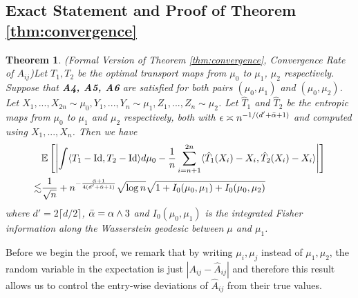 \documentclass[nohyperref]{article}
\DeclareMathOperator*{\id}{Id}
\newtheorem{theorem}{Theorem}
\theoremstyle{definition}
\begin{document}
\subsection{Exact Statement and Proof of Theorem \ref{thm:convergence}}\label{SM:Thm2Proof}


\begin{theorem}(Formal Version of Theorem \ref{thm:convergence}, Convergence Rate of $A_{ij}$)\label{thm:Thm3Proof_Exact}
    Let $T_1,T_2$ be the optimal transport maps from $\mu_0$ to $\mu_1$, $\mu_2$ respectively. Suppose that \textbf{A4, A5, A6} are satisfied for both pairs $(\mu_0, \mu_1)$ and $(\mu_0, \mu_2)$. Let $X_1,...,X_{2n} \sim \mu_0, Y_1,...,Y_n \sim \mu_1, Z_1,...,Z_n \sim \mu_2$. Let $\hat{T}_1$ and $\hat{T}_2$ be the entropic maps from $\mu_0$ to $\mu_1$ and $\mu_2$ respectively, both with $\epsilon \asymp n^{-1/(d'+\Bar{\alpha}+1)}$ and computed using $X_{1},...,X_{n}$. Then we have
    \begin{align*}
       &\mathbb{E}\left [ \left | \int \langle T_1 - \id, T_2 - \id \rangle d\mu_0 - \frac{1}{n} \sum_{i=n+1}^{2n} \langle \hat{T}_1(X_i) - X_i, \hat{T}_2(X_i) - X_i \rangle \right | \right ] \\
            \lesssim& \frac{1}{\sqrt{n}} + n^{-\frac{\Bar{\alpha}+ 1}{4(d' + \Bar{\alpha} + 1) }}\sqrt{\log n}\sqrt{1+I_0(\mu_0,\mu_1) + I_0(\mu_0, \mu_2)}
    \end{align*}
    where  $d' = 2\lceil d/2 \rceil$, $\Bar{\alpha} = \alpha \wedge 3$ and $I_0(\mu_0,\mu_1)$ is the integrated Fisher information along the Wasserstein geodesic between $\mu$ and $\mu_1$.
\end{theorem}

Before we begin the proof, we remark that by writing $\mu_i,\mu_j$ instead of $\mu_1,\mu_2$, the random variable in the expectation is just $|A_{ij} - \hat{A}_{ij}|$ and therefore this result allows us to control the entry-wise deviations of $\hat{A}_{ij}$ from their true values.
\end{document}

